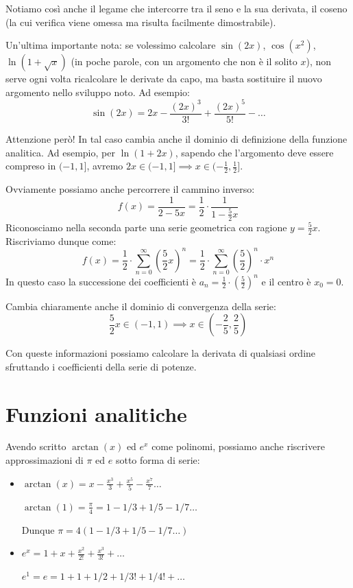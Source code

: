 \documentclass[12pt]{report}
\begin{document}
	Notiamo così anche il legame che intercorre tra il seno e la sua derivata, il coseno (la cui verifica viene omessa ma risulta facilmente dimostrabile).
	
	Un'ultima importante nota: se volessimo calcolare $\sin(2x)$, $\cos(x^2)$, $\ln(1 + \sqrt{x})$ (in poche parole, con un argomento che non è il solito $x$), non serve ogni volta ricalcolare le derivate da capo, ma basta sostituire il nuovo argomento nello sviluppo noto.
	Ad esempio:
	\[
	\sin(2x) = 2x - \frac{(2x)^3}{3!} + \frac{(2x)^5}{5!} - \dots
	\]
	
	Attenzione però! In tal caso cambia anche il dominio di definizione della funzione analitica. Ad esempio, per $\ln(1 + 2x)$, sapendo che l'argomento deve essere compreso in $(-1, 1]$, avremo $2x \in (-1, 1] \implies x \in (-\frac{1}{2}, \frac{1}{2}]$.
	
	Ovviamente possiamo anche percorrere il cammino inverso:
	\[
	f(x) = \frac{1}{2 - 5x} = \frac{1}{2} \cdot \frac{1}{1 - \frac{5}{2}x}
	\]
	Riconosciamo nella seconda parte una serie geometrica con ragione $y = \frac{5}{2}x$. Riscriviamo dunque come:
	\[
	f(x) = \frac{1}{2} \cdot \sum_{n=0}^{\infty} \left(\frac{5}{2}x\right)^n = \frac{1}{2} \cdot \sum_{n=0}^{\infty} \left(\frac{5}{2}\right)^n \cdot x^n
	\]
	In questo caso la successione dei coefficienti è $a_n = \frac{1}{2} \cdot \left(\frac{5}{2}\right)^n$ e il centro è $x_0 = 0$.
	
	Cambia chiaramente anche il dominio di convergenza della serie:
	\[
	\frac{5}{2}x \in (-1, 1) \implies x \in \left(-\frac{2}{5}, \frac{2}{5}\right)
	\]
	
	Con queste informazioni possiamo calcolare la derivata di qualsiasi ordine sfruttando i coefficienti della serie di potenze.
	
	\chapter{Funzioni analitiche}
	
	Avendo scritto $\arctan(x)$ ed $e^x$ come polinomi, possiamo anche riscrivere approssimazioni di $\pi$ ed $e$ sotto forma di serie:
	\begin{itemize}
		
		\item $\arctan(x) = x - \frac{x^3}{3} + \frac{x^5}{5} - \frac{x^7}{7} \dots$
		
		$\arctan(1) = \frac{\pi}{4} = 1 - 1/3 + 1/5 - 1/7 \dots$
		
		Dunque $\pi = 4(1 - 1/3 + 1/5 - 1/7 \dots)$
		
		\item $e^x = 1 + x + \frac{x^2}{2!} + \frac{x^3}{3!} + \dots$
		
		$e^1 = e = 1 + 1 + 1/2 + 1/3! + 1/4! + \dots$
		
	\end{itemize}
	
\end{document}
